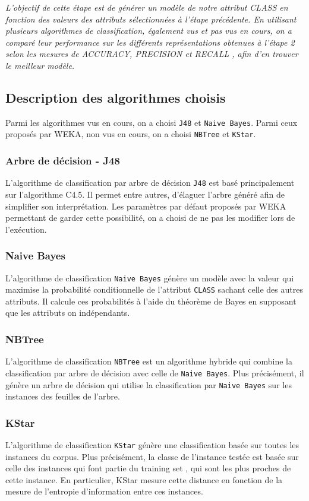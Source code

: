\textit{L’objectif de cette étape est de générer un modèle de notre attribut CLASS en fonction des valeurs des attributs sélectionnées à l’étape précédente. En utilisant plusieurs algorithmes de classification, également vus et pas vus en cours, on a comparé leur performance sur les différents représentations obtenues à l’étape 2 selon les mesures de \og ACCURACY, PRECISION et RECALL \fg{} , afin d’en trouver le meilleur modèle.}

\subsection{Description des algorithmes choisis}
Parmi les algorithmes vus en cours, on a choisi \texttt{J48} et \texttt{Naive Bayes}. Parmi ceux proposés par WEKA, non vus en cours, on a choisi \texttt{NBTree} et \texttt{KStar}.

\subsubsection {Arbre de décision - J48}
L'algorithme de classification par arbre de décision \texttt{J48} est basé principalement sur l'algorithme C4.5. Il permet entre autres, d'élaguer l'arbre généré afin de simplifier son interprétation. Les paramètres par défaut proposés par WEKA permettant de garder cette possibilité, on a choisi de ne pas les modifier lors de l'exécution.
\subsubsection{Naive Bayes}
 L'algorithme de classification \texttt{Naive Bayes} génère un modèle avec la valeur qui maximise la probabilité conditionnelle de l'attribut \texttt{CLASS} sachant celle des autres attributs. Il calcule ces probabilités à l'aide du théorème de Bayes en supposant que les attributs on indépendants.
 \subsubsection{NBTree}
 L'algorithme de classification \texttt{NBTree} est un algorithme hybride qui combine la classification par arbre de décision avec celle de \texttt{Naive Bayes}. Plus précisément, il génère un arbre de décision qui utilise la classification par \texttt{Naive Bayes} sur les instances des feuilles de l'arbre.
 \subsubsection{KStar}
 L'algorithme de classification \texttt{KStar} génère une classification basée sur toutes les instances du corpus. Plus précisément, la classe de l'instance testée est basée sur celle des instances qui font partie du \og training set \fg{}, qui sont les plus \og proches \fg{} de cette instance. En particulier, KStar mesure cette distance en fonction de la mesure de l'entropie d'information entre ces instances. 
